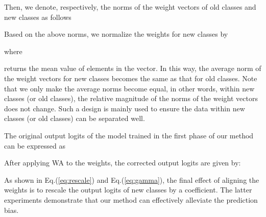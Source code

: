 \documentclass[10pt,twocolumn,letterpaper]{article}
\begin{document}
Then, we denote, respectively, the norms of the weight vectors of old classes and new classes  as follows



Based on the above norms, we normalize the weights for new classes by

where 

 returns the mean value of elements in the vector.
In this way, the average norm of the weight vectors for new classes becomes the same as that for old classes. Note that we only make the average norms become equal, in other words, within new classes (or old classes), the relative magnitude of the norms of the weight vectors does not change. Such a design is mainly used to ensure the data within new classes (or old classes) can be separated well.

The original output logits of the model trained in the first phase of our method can be expressed as 

After applying WA to the weights, the corrected output logits are given by:

As shown in Eq.(\ref{eq:rescale}) and Eq.(\ref{eq:gamma}), the final effect of aligning the weights is to rescale the output logits of new classes by a coefficient. The latter experiments demonstrate that our method can effectively alleviate the prediction bias.
\end{document}
